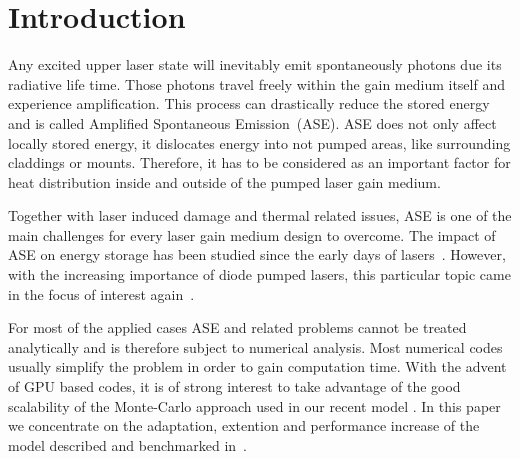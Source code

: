\section{Introduction}
Any excited upper laser state will inevitably emit spontaneously photons due
its radiative life time. Those photons travel freely within the gain medium
itself and experience amplification. This process can drastically reduce the
stored energy and is called Amplified Spontaneous Emission~(ASE). ASE does not
only affect locally stored energy, it dislocates energy into not pumped areas,
like surrounding claddings or mounts. Therefore, it has to be considered as an
important factor for heat distribution inside and outside of the pumped laser
gain medium.

Together with laser induced damage and thermal related issues, ASE is one of the
main challenges for every laser gain medium design to overcome. The impact of ASE on
energy storage has been studied since the early days of lasers~\cite{Intro1,Intro2,Intro3}.
However, with the increasing importance of diode pumped lasers, this particular
topic came in the focus of interest again~\cite{Intro4}.

For most of the applied cases ASE and related problems cannot be treated
analytically and is therefore subject to numerical analysis. Most numerical
codes usually simplify the problem in order to gain computation time. With the
advent of GPU based codes, it is of strong interest to take advantage of the
good scalability of the Monte-Carlo approach used in our recent model \cite{Intro4}.
In this paper we concentrate on the adaptation, extention and performance
increase of the model described and benchmarked in~\cite{Intro4}.
